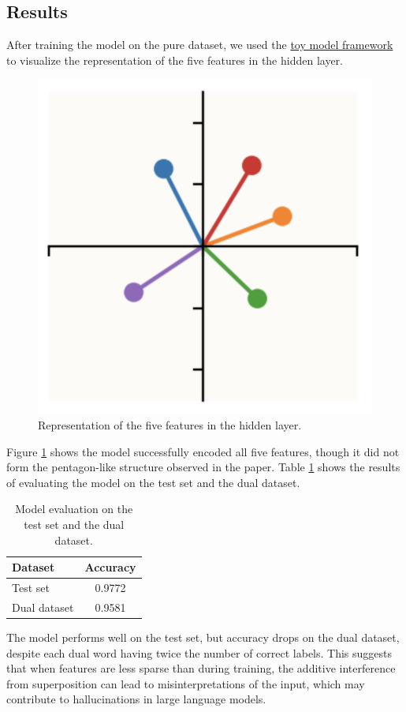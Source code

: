\subsection{Results}
After training the model on the pure dataset, we used the \href{https://colab.research.google.com/github/anthropics/toy-models-of-superposition/blob/main/toy_models.ipynb}{toy model framework} to visualize the representation of the five features in the hidden layer.
\begin{figure}[h]
	\centering
	\includegraphics[width=0.5\linewidth]{figures/hidden_layer_representation.png}
	\caption{Representation of the five features in the hidden layer.}
	\label{fig:hidden_layer_representation}
\end{figure}
Figure \ref{fig:hidden_layer_representation} shows the model successfully encoded all five features, though it did not form the pentagon-like structure observed in the paper.
Table \ref{tab:hallucinations_results} shows the results of evaluating the model on the test set and the dual dataset.
\begin{table}[h]
	\centering
	\begin{tabular}{lc}
		\toprule
		\textbf{Dataset} & \textbf{Accuracy} \\
		\midrule
		Test set         & 0.9772            \\
		Dual dataset     & 0.9581            \\
		\bottomrule
	\end{tabular}
	\caption{Model evaluation on the test set and the dual dataset.}
	\label{tab:hallucinations_results}
\end{table}
The model performs well on the test set, but accuracy drops on the dual dataset, despite each dual word having twice the number of correct labels.
This suggests that when features are less sparse than during training, the additive interference from superposition can lead to misinterpretations of the input, which may contribute to hallucinations in large language models.
